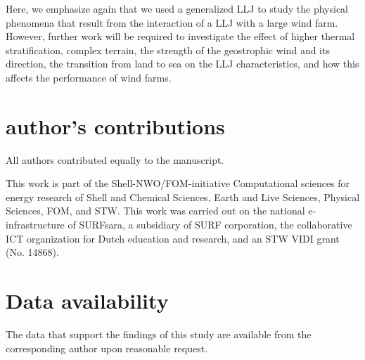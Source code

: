 \documentclass[%
 aip,
 amsmath,amssymb,
reprint,
twocolumn,%
author-numerical,%
]{revtex4-1}
\begin{document}
 Here, we emphasize again that we used a generalized LLJ to study the physical phenomena that result from the interaction of a LLJ with a large wind farm. However, further work will be required to investigate the effect of higher thermal stratification, complex terrain, the strength of the geostrophic wind and its direction, the transition from land to sea on the LLJ characteristics, and how this affects the performance of wind farms.

\section*{author's contributions}
\noindent All authors contributed equally to the manuscript.  

\begin{acknowledgments}
This work is part of the Shell-NWO/FOM-initiative Computational sciences for energy research of Shell and Chemical Sciences, Earth and Live Sciences, Physical Sciences, FOM, and STW. This work was carried out on the national e-infrastructure of SURFsara, a subsidiary of SURF corporation, the collaborative ICT organization for Dutch education and research, and an STW VIDI grant (No. 14868).
\end{acknowledgments}

\section*{Data availability}
\noindent The data that support the findings of this study are available from the corresponding author upon reasonable request.
\end{document}
